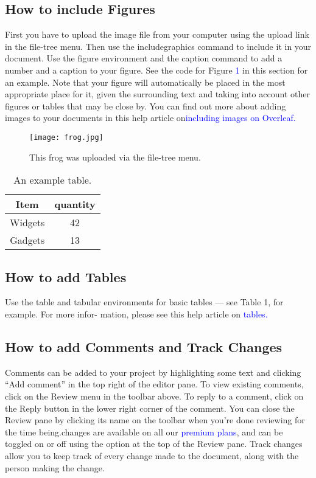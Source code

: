 \documentclass{article}
\begin{document}
{ \subsection{How to include Figures}
 First you have to upload the image file from your computer using the upload link in the file-tree menu.
 Then use the includegraphics command to include it in your document. Use the figure environment
 and the caption command to add a number and a caption to your figure. See the code for Figure \textcolor{blue}{1} in
 this section for an example.
 Note that your figure will automatically be placed in the most appropriate place for it, given the
 surrounding text and taking into account other figures or tables that may be close by. You can find
 out more about adding images to your documents in this help article on\textcolor{blue}{including images on Overleaf.}
  \begin{figure}
  	\centering
  	\texttt{[image: frog.jpg]}
  	\caption{This frog was uploaded via the file-tree menu.}
 \end{figure}
\begin{table}
	\centering 
	\begin{tabular}{c|c}
		Item   & quantity\\
		\hline
		Widgets & 42\\
		\hline
		Gadgets & 13
	\end{tabular}
	\caption{An example table.}
	\label{tab:example}
\end{table}
 \newline
 \subsection{How to add Tables}
Use the table and tabular environments for basic tables — see Table 1, for example. For more infor-
mation, please see this help article on \textcolor{blue}{ tables.}
\subsection{How to add Comments and Track Changes}
Comments can be added to your project by highlighting some text and clicking “Add comment” in
the top right of the editor pane. To view existing comments, click on the Review menu in the toolbar
above. To reply to a comment, click on the Reply button in the lower right corner of the comment.
You can close the Review pane by clicking its name on the toolbar when you’re done reviewing for the
time being.\newline changes are available on all our \textcolor{blue}{premium plans}, and can be toggled on or off using the option
at the top of the Review pane. Track changes allow you to keep track of every change made to the
document, along with the person making the change.
}
\end{document}
